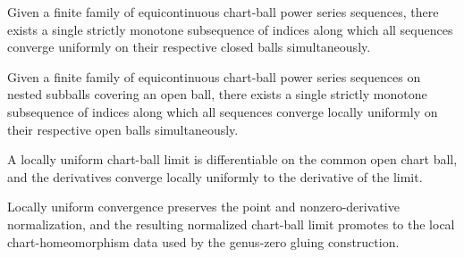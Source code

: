 \begin{lemma}
\label{lem:montel-chartball-finite-family-diagonal-extraction}
Given a finite family of equicontinuous chart-ball power series sequences, 
there exists a single strictly monotone subsequence of indices along which
all sequences converge uniformly on their respective closed balls simultaneously.
\leanok
\end{lemma}

\begin{lemma}
\label{lem:montel-finite-family-locally-uniform-diagonal-extraction}
Given a finite family of equicontinuous chart-ball power series sequences on nested subballs covering an open ball, there exists a single strictly monotone subsequence of indices along which all sequences converge locally uniformly on their respective open balls simultaneously.
\leanok
\end{lemma}

\begin{lemma}
\label{lem:montel-chartball-weierstrass-limit}
A locally uniform chart-ball limit is differentiable on the common open chart
ball, and the derivatives converge locally uniformly to the derivative of the
limit.
\leanok
\end{lemma}

\begin{lemma}
\label{lem:montel-chartball-normalized-local-chart}
Locally uniform convergence preserves the point and nonzero-derivative
normalization, and the resulting normalized chart-ball limit promotes to the
local chart-homeomorphism data used by the genus-zero gluing construction.
\leanok
\end{lemma}

